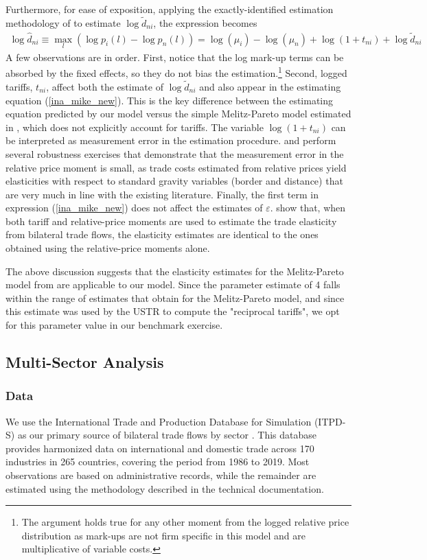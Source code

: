 \documentclass[12pt]{article}
\begin{document}
Furthermore, for ease of exposition, applying the exactly-identified estimation methodology of \citet{NBERw20495} to estimate $\log \tilde d_{ni}$, the expression becomes
\begin{align}
    \log \hat d_{ni}\equiv\max_{l}(\log p_i(l)-\log p_n(l))=\log(\mu_i)-\log(\mu_n) +\log (1+t_{ni})+\log\tilde d_{ni}
\end{align}
A few observations are in order. First, notice that the log mark-up terms can be absorbed by the fixed effects, so they do not bias the estimation.\footnote{The argument holds true for any other moment from the logged relative price distribution as mark-ups are not firm specific in this model and are multiplicative of variable costs.} Second, logged tariffs, $t_{ni}$, affect both the estimate of $\log \tilde d_{ni}$ and also appear in the estimating equation (\ref{ina_mike_new}). This is the key difference between the estimating equation predicted by our model versus the simple Melitz-Pareto model estimated in \citet{NBERw20495}, which does not explicitly account for tariffs. The variable $\log(1+t_{ni})$ can be interpreted as measurement error in the estimation procedure. \citet{simonovska2014elasticity} and \citet{NBERw20495} perform several robustness exercises that demonstrate that the measurement error in the relative price moment is small, as trade costs estimated from relative prices yield elasticities with respect to standard gravity variables (border and distance) that are very much in line with the existing literature. Finally, the first term in expression (\ref{ina_mike_new}) does not affect the estimates of $\varepsilon$. \citet{NBERw20495} show that, when both tariff and relative-price moments are used to estimate the trade elasticity from bilateral trade flows, the elasticity estimates are identical to the ones obtained using the relative-price moments alone.   

The above discussion suggests that the elasticity estimates for the Melitz-Pareto model from \citet{NBERw20495} are applicable to our model. Since the parameter estimate of 4 falls within the range of estimates that \citet{NBERw20495} obtain for the Melitz-Pareto model, and since this estimate was used by the USTR to compute the "reciprocal tariffs", we opt for this parameter value in our benchmark exercise. 


\subsection{Multi-Sector Analysis}
\subsubsection{Data}
We use the International Trade and Production Database for Simulation (ITPD-S) as our primary source of bilateral trade flows by sector \citep{borchert2024globalization}. This database provides harmonized data on international and domestic trade across 170 industries in 265 countries, covering the period from 1986 to 2019. Most observations are based on administrative records, while the remainder are estimated using the methodology described in the technical documentation. 
\end{document}
